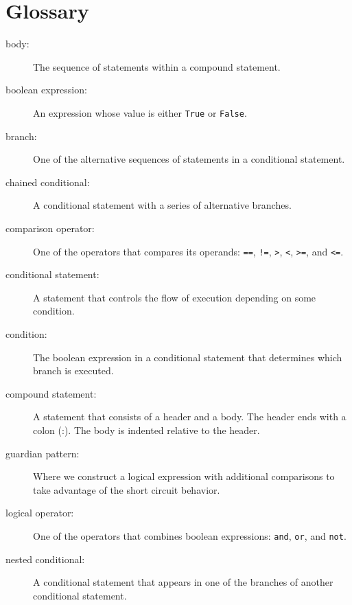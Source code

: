\documentclass[10pt]{book}
\begin{document}
\section{Glossary}

\begin{description}

\item[body:] The sequence of statements within a compound statement.

\item[boolean expression:]  An expression whose value is either 
{\tt True} or {\tt False}.

\item[branch:] One of the alternative sequences of statements in
a conditional statement.

\item[chained conditional:]  A conditional statement with a series
of alternative branches.

\item[comparison operator:] One of the operators that compares
its operands: {\tt ==}, {\tt !=}, {\tt >}, {\tt <}, {\tt >=}, and {\tt <=}.

\item[conditional statement:]  A statement that controls the flow of
execution depending on some condition.

\item[condition:] The boolean expression in a conditional statement
that determines which branch is executed.

\item[compound statement:]  A statement that consists of a header
and a body.  The header ends with a colon (:).  The body is indented
relative to the header.

\item[guardian pattern:] Where we construct a logical expression 
with additional
comparisons to take advantage of the short circuit behavior.

\item[logical operator:] One of the operators that combines boolean
expressions: {\tt and}, {\tt or}, and {\tt not}.

\item[nested conditional:]  A conditional statement that appears
in one of the branches of another conditional statement.


\end{description}
\end{document}

